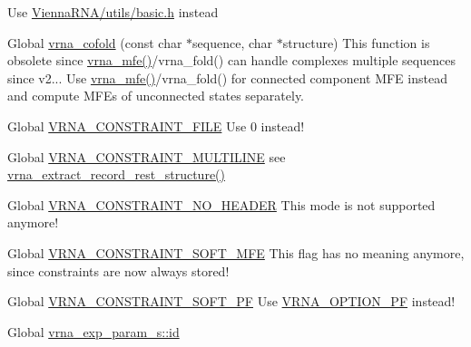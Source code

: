 \begin{DoxyRefList}
\label{deprecated__deprecated000141}%
%
Use \mbox{\hyperlink{utils_2basic_8h}{Vienna\+RNA/utils/basic.\+h}} instead  
\item[Global \mbox{\hyperlink{group__mfe__global_ga9ef3a297201dbf838a8daff2b45c0c82}{vrna\+\_\+cofold}} (const char $\ast$sequence, char $\ast$structure)]\label{deprecated__deprecated000090}%
%
This function is obsolete since \mbox{\hyperlink{group__mfe__global_gabd3b147371ccf25c577f88bbbaf159fd}{vrna\+\_\+mfe()}}/vrna\+\_\+fold() can handle complexes multiple sequences since v2... Use \mbox{\hyperlink{group__mfe__global_gabd3b147371ccf25c577f88bbbaf159fd}{vrna\+\_\+mfe()}}/vrna\+\_\+fold() for connected component MFE instead and compute MFEs of unconnected states separately. 
\item[Global \mbox{\hyperlink{group__constraints_ga62e0ed0c33002c09423de4e646f85a2b}{VRNA\+\_\+\+CONSTRAINT\+\_\+\+FILE}} ]\label{deprecated__deprecated000157}%
%
Use 0 instead!  
\item[Global \mbox{\hyperlink{group__file__formats_ga7d725ef525b29891abef3f1ed42599a4}{VRNA\+\_\+\+CONSTRAINT\+\_\+\+MULTILINE}} ]\label{deprecated__deprecated000164}%
%
see \mbox{\hyperlink{group__file__formats_gad37cbb63a05eed63ba25c91628409be0}{vrna\+\_\+extract\+\_\+record\+\_\+rest\+\_\+structure()}}  
\item[Global \mbox{\hyperlink{hard_8h_a08d12a9a846ea593b7171d277c9f033f}{VRNA\+\_\+\+CONSTRAINT\+\_\+\+NO\+\_\+\+HEADER}} ]\label{deprecated__deprecated000160}%
%
This mode is not supported anymore! 
\item[Global \mbox{\hyperlink{group__constraints_ga62aa195893d02d1a79ca94952748df36}{VRNA\+\_\+\+CONSTRAINT\+\_\+\+SOFT\+\_\+\+MFE}} ]\label{deprecated__deprecated000158}%
%
This flag has no meaning anymore, since constraints are now always stored!  
\item[Global \mbox{\hyperlink{group__constraints_ga03fb5000c19b9a2082bf4ea30a543045}{VRNA\+\_\+\+CONSTRAINT\+\_\+\+SOFT\+\_\+\+PF}} ]\label{deprecated__deprecated000159}%
%
Use \mbox{\hyperlink{group__fold__compound_gabfbadcddda3e74ce7f49035ef8f058f7}{VRNA\+\_\+\+OPTION\+\_\+\+PF}} instead!  
\item[Global \mbox{\hyperlink{group__energy__parameters_a378d5bcf2bae1f3ec84c912c7d3908d2}{vrna\+\_\+exp\+\_\+param\+\_\+s\+::id}} ]\label{deprecated__deprecated000152}%

\end{DoxyRefList}
